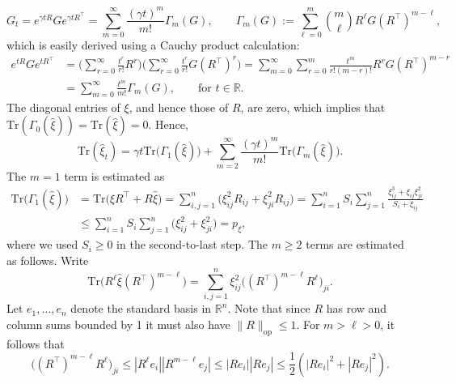 \documentclass[11pt,reqno]{amsart}
\numberwithin{equation}{section}
\theoremstyle{definition}
\def\BB{{\Gamma}}
\def\R{{\mathbb R}}
\def\tr{{\mathrm{Tr}}}
\begin{document}
\begin{equation}
G_t = e^{\gamma t R}G e^{\gamma t R^\top} = \sum_{m=0}^\infty \frac{(\gamma t)^m}{m!} \Gamma_m(G), \qquad \Gamma_m(G) := \sum_{\ell=0}^m {m \choose \ell} R^\ell G(R^\top)^{m-\ell}, \label{pf:avg-taylorseries}
\end{equation}
which is easily derived using a Cauchy product calculation:
\begin{align}
e^{  t R} G e^{ tR^\top} &= \bigg(\sum_{r=0}^\infty  \frac{t^r}{r!} R^r\bigg)\bigg(\sum_{r=0}^\infty  \frac{t^r}{r!} G(R^\top)^r\bigg) = \sum_{m=0}^\infty \sum_{r=0}^m  \frac{t^m}{r!(m-r)!}R^r G (R^\top)^{m-r} \nonumber \\
	&= \sum_{m=0}^\infty \frac{t^m}{m!} \BB_m(G), \qquad \text{for } t \in \R . \label{pf:Gamma-CauchyProduct}
\end{align}
The diagonal entries of $\xi$, and hence those of $R$, are zero, which implies that $\tr (\Gamma_0(\widehat{\xi}))=\tr (\widehat{\xi})=0$. Hence, 
\begin{equation}
\tr(\widehat{\xi}_t) = \gamma t \tr \big(\Gamma_1(\widehat{\xi})\big) + \sum_{m=2}^\infty \frac{(\gamma t)^m}{m!} \tr \big(\Gamma_m(\widehat{\xi})\big). \label{pf:avg-trxihat-taylor}
\end{equation}
The $m=1$ term is estimated as
\begin{align}
\tr \big(\Gamma_1(\widehat{\xi})\big) &= \tr \big(\widehat{\xi} R^\top +  R \widehat{\xi} \big) = \sum_{i,j=1}^{n}  \big( \xi_{ij}^2 R_{ij}  + \xi_{ji}^2 R_{ij}\big) = \sum_{i=1}^n S_i \sum_{j=1}^n  \frac{\xi_{ij}^3 + \xi_{ij}\xi_{ji}^2}{S_i + \xi_{ij}} \nonumber \\
& \le  \sum_{i=1}^n S_i \sum_{j=1}^n \big(\xi^2_{ij} + \xi_{ji}^2  \big) =  p_\xi,
 \label{pf:avg-trxihat-taylor1}
\end{align}
where we used $S_i \ge 0$ in the second-to-last step.
The $m \ge 2$ terms are estimated as follows. Write
\begin{equation*}
\tr\big(R^\ell \widehat{\xi} (R^\top)^{m-\ell}\big)  = \sum_{i,j=1}^n \xi_{ij}^2 \big( (R^\top)^{m-\ell} R^\ell\big)_{ji}.
\end{equation*}
Let $e_1,\ldots,e_n$ denote the standard basis in $\R^n$.
Note that since $R$ has row and column sums bounded by 1 it must also have  $\|R\|_{\mathrm{op}} \le 1$. 
For $m > \ell > 0$, it follows that
\begin{equation*}
\big( (R^\top)^{m-\ell} R^\ell\big)_{ji}  \le |R^\ell e_i| |R^{m-\ell}e_j| \le 
|R e_i| |R e_j| \le \frac12(|R e_i|^2 + |R e_j|^2).
\end{equation*}
\end{document}
